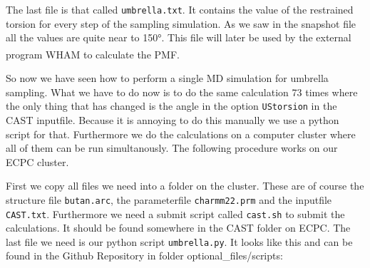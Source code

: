 \documentclass[a4paper,11pt]{scrartcl}
\newcommand{\myCite}[1]{\textsuperscript{\cite{#1}}}
\begin{document}
The last file is that called \texttt{umbrella.txt}. It contains the value of the restrained torsion for every step of the sampling simulation. As we saw in the snapshot file all the values are quite near to 150°. This file will later be used by the external program WHAM\myCite{grossfield_wham_nodate} to calculate the PMF.
\\
\FloatBarrier

So now we have seen how to perform a single MD simulation for umbrella sampling. What we have to do now is to do the same calculation 73 times where the only thing that has changed is the angle in the option \texttt{UStorsion} in the CAST inputfile. Because it is annoying to do this manually we use a python script for that. Furthermore we do the calculations on a computer cluster where all of them can be run simultanously. The following procedure works on our ECPC cluster. 

First we copy all files we need into a folder on the cluster. These are of course the structure file \texttt{butan.arc}, the parameterfile \texttt{charmm22.prm} and the inputfile \texttt{CAST.txt}. Furthermore we need a submit script called \texttt{cast.sh} to submit the calculations. It should be found somewhere in the CAST folder on ECPC. The last file we need is our python script \texttt{umbrella.py}. It looks like this and can be found in the Github Repository in folder \mbox{optional\_files/scripts}:
\end{document}
